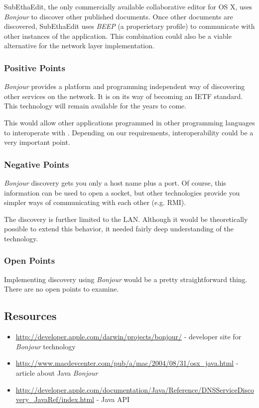 SubEthaEdit, the only commercially available collaborative editor for OS X, uses \emph{Bonjour} to discover other published documents. Once other documents are discovered, SubEthaEdit uses \emph{BEEP} (a properietary profile) to communicate with other instances of the application. This combination could also be a viable alternative for the network layer implementation.

\subsubsection{Positive Points}
\emph{Bonjour} provides a platform and programming independent way of discovering other services on the network. It is on its way of becoming an IETF standard. This technology will remain available for the years to come.

This would allow other applications programmed in other programming languages to interoperate with \ace. Depending on our requirements, interoperability could be a very important point.

\subsubsection{Negative Points}
\emph{Bonjour} discovery gets you only a host name plus a port. Of course, this information can be used to open a socket, but other technologies provide you simpler ways of communicating with each other (e.g. RMI).

The discovery is further limited to the LAN. Although it would be theoretically possible to extend this behavior, it needed fairly deep understanding of the technology.

\subsubsection{Open Points}
Implementing discovery using \emph{Bonjour} would be a pretty straightforward thing. There are no open points to examine.



\subsection{Resources}
\begin{itemize}
 \item \url{http://developer.apple.com/darwin/projects/bonjour/} - developer site for \emph{Bonjour} technology
 \item \url{http://www.macdevcenter.com/pub/a/mac/2004/08/31/osx_java.html} - article about Java \emph{Bonjour}
 \item \url{http://developer.apple.com/documentation/Java/Reference/DNSServiceDiscovery_JavaRef/index.html} - Java API
\end{itemize}
